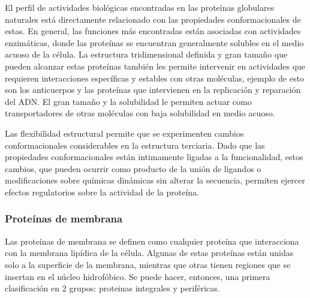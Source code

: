 El perfil de actividades biológicas encontradas en las proteínas globulares naturales está directamente relacionado con las propiedades conformacionales de estas.
En general, las funciones más encontradas están asociadas con actividades enzimáticas, donde las proteínas se encuentran generalmente solubles en el medio acuoso de la célula.
La estructura tridimensional definida y gran tamaño que pueden alcanzar estas proteínas también les permite intervenir en actividades que requieren interacciones específicas y estables con otras moléculas, 
ejemplo de esto son los anticuerpos y las proteínas que intervienen en la replicación y reparación del ADN.
El gran tamaño y la solubilidad le permiten actuar como transportadores de otras moléculas con baja solubilidad en medio acuoso.

Las flexibilidad estructural permite que se experimenten cambios conformacionales considerables en la estructura terciaria. 
Dado que las propiedades conformacionales están intimamente ligadas a la funcionalidad, estos cambios, 
que pueden ocurrir como producto de la unión de ligandos o modificaciones sobre químicas dinámicas sin alterar la secuencia, permiten ejercer efectos regulatorios sobre la actividad de la proteína.






% 
% 
% 

















\subsubsection{Proteínas de membrana}
Las proteínas de membrana se definen como cualquier proteína que interacciona con la membrana lipídica de la célula.
Algunas de estas proteínas están unidas solo a la superficie de la membrana, mientras que otras tienen regiones que se insertan en el núcleo hidrofóbico.
Se puede hacer, entonces, una primera clasificación en 2 grupos: proteinas integrales y periféricas.

